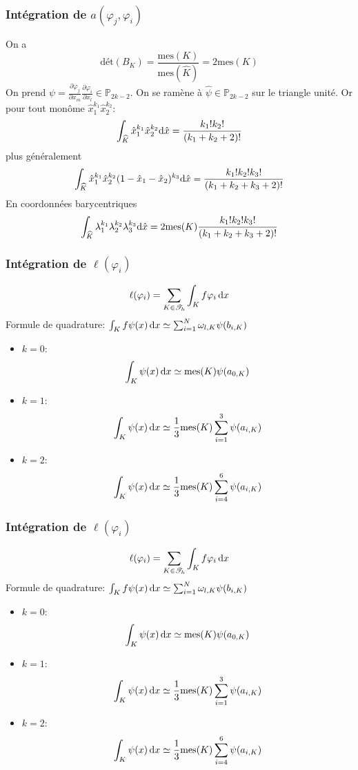 \documentclass{beamer}
\def \de {{\rm d}}
\begin{document}
\begin{frame}
\frametitle{Intégration de $a(\varphi_j,\varphi_i)$}
On a 
\[\mbox{dét}(B_K)=\frac{\mbox{mes}(K)}{\mbox{mes}(\widehat{K})}=2\mbox{mes}(K)\]
On prend $\psi=\frac{\partial \varphi_j}{\partial x_m}\frac{\partial \varphi_i}{\partial x_l}\in \mathbb{P}_{2k-2}$. On se ramène à $\widehat{\psi}\in \mathbb{P}_{2k-2}$ sur le triangle unité. Or pour tout monôme $\hat{x}_1^{k_1}\hat{x}_2^{k_2}$:
\[\int_{\widehat{K}}\hat{x}_1^{k_1}\hat{x}_2^{k_2}\de \hat{x}=\frac{k_1!k_2!}{(k_1+k_2+2)!}\]
plus généralement
\[\int_{\widehat{K}}\hat{x}_1^{k_1}\hat{x}_2^{k_2}(1-\hat{x}_1-\hat{x}_2)^{k_3}\de \hat{x}=\frac{k_1!k_2!k_3!}{(k_1+k_2+k_3+2)!}\]
En coordonnées barycentriques
\[\int_{\widehat{K}}\lambda_1^{k_1}\lambda_2^{k_2}\lambda_3^{k_3}\de \hat{x}=2\mbox{mes}(K)\frac{k_1!k_2!k_3!}{(k_1+k_2+k_3+2)!}\]

\end{frame}

\begin{frame}
\frametitle{Intégration de $\ell(\varphi_i)$}
\[\ell(\varphi_i)=\sum_{K\in{\cal T}_h}\int_K f \varphi_i\,\de x\]
Formule de quadrature: $\int_K f \psi(x)\,\de x\simeq \sum_{i=1}^N\omega_{l,K}\psi(b_{i,K})$
\begin{itemize}
\item $k=0$: 
\[\int_K \psi(x)\,\de x\simeq \mbox{mes}(K) \psi(a_{0,K})\]
\item $k=1$: 
\[\int_K \psi(x)\,\de x\simeq \frac 13\mbox{mes}(K) \sum_{i=1}^3\psi(a_{i,K})\]
\item $k=2$: 
\[\int_K \psi(x)\,\de x\simeq \frac 13\mbox{mes}(K) \sum_{i=4}^6\psi(a_{i,K})\]
\end{itemize}
\end{frame}
\begin{frame}
\frametitle{Intégration de $\ell(\varphi_i)$}
\[\ell(\varphi_i)=\sum_{K\in{\cal T}_h}\int_K f \varphi_i\,\de x\]
Formule de quadrature: $\int_K f \psi(x)\,\de x\simeq \sum_{i=1}^N\omega_{l,K}\psi(b_{i,K})$
\begin{itemize}
\item $k=0$: 
\[\int_K \psi(x)\,\de x\simeq \mbox{mes}(K) \psi(a_{0,K})\]
\item $k=1$: 
\[\int_K \psi(x)\,\de x\simeq \frac 13\mbox{mes}(K) \sum_{i=1}^3\psi(a_{i,K})\]
\item $k=2$: 
\[\int_K \psi(x)\,\de x\simeq \frac 13\mbox{mes}(K) \sum_{i=4}^6\psi(a_{i,K})\]
\end{itemize}
\end{frame}
\end{document}
